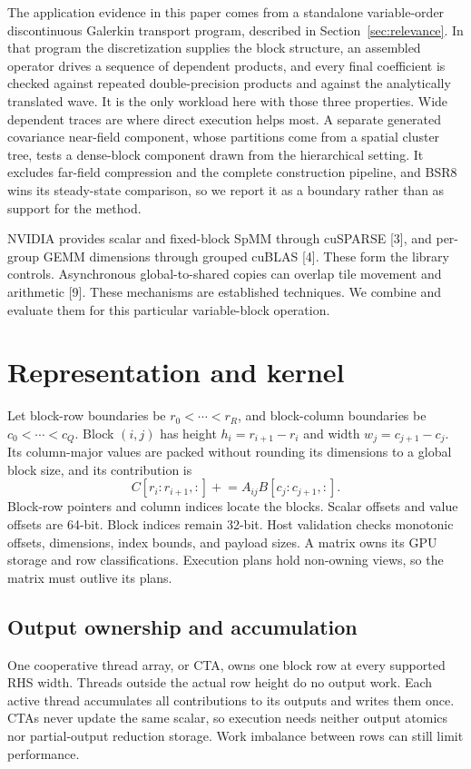 \documentclass[10pt]{article}
\begin{document}
The application evidence in this paper comes from a standalone
variable-order discontinuous Galerkin transport program, described in
Section~\ref{sec:relevance}. In that program the discretization supplies the
block structure, an assembled operator drives a sequence of dependent
products, and every final coefficient is checked against repeated
double-precision products and against the analytically translated wave.
It is the only workload here with those three properties. Wide dependent
traces are where direct execution helps most. A separate generated covariance near-field component, whose partitions
come from a spatial cluster tree, tests a dense-block component drawn from the
hierarchical setting. It excludes far-field compression and the complete
construction pipeline, and BSR8 wins its steady-state comparison, so we report
it as a boundary rather than as support for the method.

NVIDIA provides scalar and fixed-block SpMM through cuSPARSE [3], and
per-group GEMM dimensions through grouped cuBLAS [4]. These form the
library controls. Asynchronous global-to-shared copies can overlap tile
movement and arithmetic [9]. These mechanisms are established techniques. We combine and evaluate them
for this particular variable-block operation.

\section{Representation and kernel}
Let block-row boundaries be \(r_0<\cdots<r_R\), and block-column boundaries
be \(c_0<\cdots<c_Q\). Block \((i,j)\) has height
\(h_i=r_{i+1}-r_i\) and width \(w_j=c_{j+1}-c_j\). Its column-major values
are packed without rounding its dimensions to a global block size, and its
contribution is
\[
C[r_i:r_{i+1},:] \mathrel{+}= A_{ij}B[c_j:c_{j+1},:].
\]
Block-row pointers and column indices locate the blocks. Scalar offsets and
value offsets are 64-bit. Block indices remain 32-bit. Host validation checks
monotonic offsets, dimensions, index bounds, and payload sizes. A matrix owns
its GPU storage and row classifications. Execution plans hold non-owning
views, so the matrix must outlive its plans.

\subsection{Output ownership and accumulation}
One cooperative thread array, or CTA, owns one block row at every supported
RHS width. Threads outside the actual row height do no output work. Each
active thread accumulates all contributions to its outputs and writes them
once. CTAs never update the same scalar, so execution needs neither output
atomics nor partial-output reduction storage. Work imbalance between rows
can still limit performance.
\end{document}
